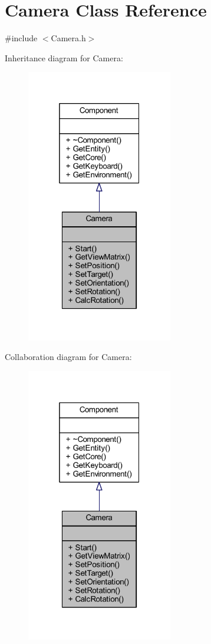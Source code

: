 \hypertarget{class_camera}{}\section{Camera Class Reference}
\label{class_camera}


{\ttfamily \#include $<$Camera.\+h$>$}



Inheritance diagram for Camera\+:
\nopagebreak
\begin{figure}[H]
\begin{center}
\leavevmode
\includegraphics[width=181pt]{class_camera__inherit__graph}
\end{center}
\end{figure}


Collaboration diagram for Camera\+:
\nopagebreak
\begin{figure}[H]
\begin{center}
\leavevmode
\includegraphics[width=181pt]{class_camera__coll__graph}
\end{center}
\end{figure}
